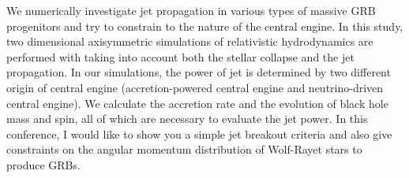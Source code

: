 


\bigskip



\bigskip

\noindent We numerically investigate jet propagation in various types of massive GRB progenitors and try to constrain to the nature of the central engine. In this study, two dimensional axisymmetric simulations of relativistic hydrodynamics are performed with taking into account both the stellar collapse and the jet propagation. In our simulations, the power of jet is determined by two different origin of central engine (accretion-powered central engine and neutrino-driven central engine). We calculate the accretion rate and the evolution of black hole mass and spin, all of which are necessary to evaluate the jet power. In this conference, I would like to show you a simple jet breakout criteria and also give constraints on the angular momentum distribution of Wolf-Rayet stars to produce GRBs.
